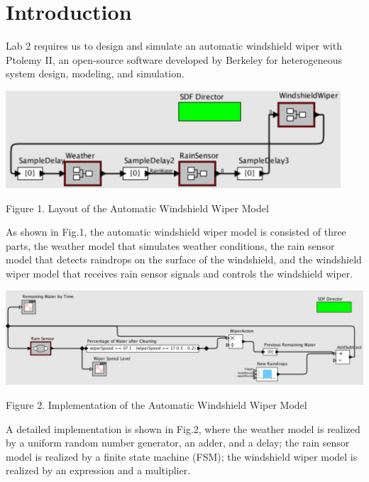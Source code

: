 \section{Introduction}
Lab 2 requires us to design and simulate an automatic windshield wiper with Ptolemy II, an open-source software developed by Berkeley for heterogeneous system design, modeling, and simulation.
\begin{center}
\includegraphics[width=12.5cm]{fig1.png}
\end{center}

\begin{center}
\small{Figure 1. Layout of the Automatic Windshield Wiper Model}
\label{layout}
\end{center}
As shown in Fig.1, the automatic windshield wiper model is consisted of three parts, the weather model that simulates weather conditions, the rain sensor model that detects raindrops on the surface of the windshield, and the windshield wiper model that receives rain sensor signals and controls the windshield wiper. 
\begin{center}
\includegraphics[width=13.5cm]{fig2.png}
\end{center}
\begin{center}
\small{Figure 2. Implementation of the Automatic Windshield Wiper Model}
\label{implementation}
\end{center}
A detailed implementation is shown in Fig.2, where the weather model is realized by a uniform random number generator, an adder, and a delay; the rain sensor model is realized by a finite state machine (FSM); the windshield wiper model is realized by an expression and a multiplier.